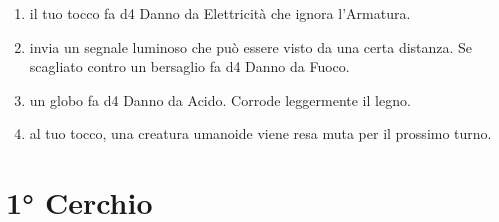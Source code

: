 \documentclass[itdr]{subfiles}
\begin{document}
\begin{enumerate}
	\item {} il tuo tocco fa d4 Danno da Elettricità che ignora l’Armatura.
	\item {} invia un segnale luminoso che può essere visto da una certa distanza. Se scagliato contro un bersaglio fa d4 Danno da Fuoco.
	\item {} un globo fa d4 Danno da Acido. Corrode leggermente il legno.
	\item {} al tuo tocco, una creatura umanoide viene resa muta per il prossimo turno.
\end{enumerate}


\vfill
\break

\section{1° Cerchio}
\def \spellcircle {1}
\end{document}

